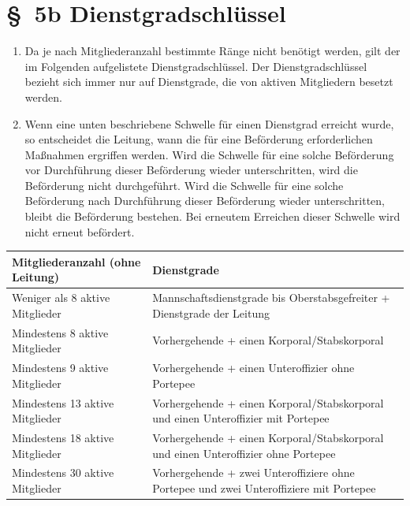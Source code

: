 \section*{\S~5b Dienstgradschlüssel}
\label{sec:dienstgradschluessel}

\begin{enumerate}[label=(\arabic*)]
	\item Da je nach Mitgliederanzahl bestimmte Ränge nicht benötigt werden, gilt der im Folgenden aufgelistete Dienstgradschlüssel. Der Dienstgradschlüssel bezieht sich immer nur auf Dienstgrade, die von aktiven Mitgliedern besetzt werden.
        \item Wenn eine unten beschriebene Schwelle für einen Dienstgrad erreicht wurde, so entscheidet die Leitung, wann die für eine Beförderung erforderlichen Maßnahmen ergriffen werden. Wird die Schwelle für eine solche Beförderung vor Durchführung dieser Beförderung wieder unterschritten, wird die Beförderung nicht durchgeführt. Wird die Schwelle für eine solche Beförderung nach Durchführung dieser Beförderung wieder unterschritten, bleibt die Beförderung bestehen. Bei erneutem Erreichen dieser Schwelle wird nicht erneut befördert.
\end{enumerate}

\begin{center}
\begin{tabular}{|p{8cm}|p{6cm}|}
	\hline
	\textbf{Mitgliederanzahl (ohne Leitung)} & \textbf{Dienstgrade} \\
	\hline
	Weniger als 8 aktive Mitglieder & Mannschaftsdienstgrade bis Oberstabsgefreiter + Dienstgrade der Leitung \\
	\hline
	Mindestens 8 aktive Mitglieder & Vorhergehende + einen Korporal/Stabskorporal \\
	\hline
	Mindestens 9 aktive Mitglieder & Vorhergehende + einen Unteroffizier ohne Portepee \\
	\hline
	Mindestens 13 aktive Mitglieder & Vorhergehende + einen Korporal/Stabskorporal und einen Unteroffizier mit Portepee \\
	\hline
	Mindestens 18 aktive Mitglieder & Vorhergehende + einen Korporal/Stabskorporal und einen Unteroffizier ohne Portepee \\
	\hline
	Mindestens 30 aktive Mitglieder & Vorhergehende + zwei Unteroffiziere ohne Portepee und zwei Unteroffiziere mit Portepee \\
	\hline
\end{tabular}
\end{center}
